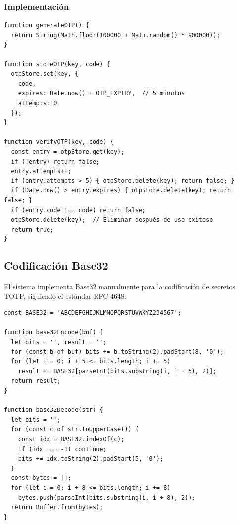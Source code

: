 \documentclass[12pt,a4paper,openany]{article}
\begin{document}
\subsubsection{Implementación}

\begin{lstlisting}[style=jsstyle, caption={Gestión OTP}]
function generateOTP() {
  return String(Math.floor(100000 + Math.random() * 900000));
}

function storeOTP(key, code) {
  otpStore.set(key, {
    code,
    expires: Date.now() + OTP_EXPIRY,  // 5 minutos
    attempts: 0
  });
}

function verifyOTP(key, code) {
  const entry = otpStore.get(key);
  if (!entry) return false;
  entry.attempts++;
  if (entry.attempts > 5) { otpStore.delete(key); return false; }
  if (Date.now() > entry.expires) { otpStore.delete(key); return false; }
  if (entry.code !== code) return false;
  otpStore.delete(key);  // Eliminar después de uso exitoso
  return true;
}
\end{lstlisting}

\subsection{Codificación Base32}

El sistema implementa Base32 manualmente para la codificación de secretos TOTP, siguiendo el estándar RFC 4648:

\begin{lstlisting}[style=jsstyle, caption={Codificación Base32 manual}]
const BASE32 = 'ABCDEFGHIJKLMNOPQRSTUVWXYZ234567';

function base32Encode(buf) {
  let bits = '', result = '';
  for (const b of buf) bits += b.toString(2).padStart(8, '0');
  for (let i = 0; i + 5 <= bits.length; i += 5)
    result += BASE32[parseInt(bits.substring(i, i + 5), 2)];
  return result;
}

function base32Decode(str) {
  let bits = '';
  for (const c of str.toUpperCase()) {
    const idx = BASE32.indexOf(c);
    if (idx === -1) continue;
    bits += idx.toString(2).padStart(5, '0');
  }
  const bytes = [];
  for (let i = 0; i + 8 <= bits.length; i += 8)
    bytes.push(parseInt(bits.substring(i, i + 8), 2));
  return Buffer.from(bytes);
}
\end{lstlisting}

\end{document}
